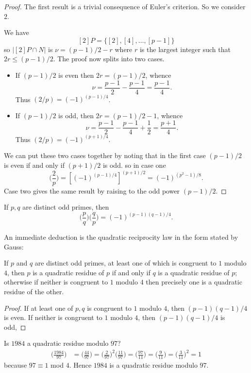 \begin{proof}
The first result is a trivial consequence of Euler's criterion. So we consider $2$.\par
We have 
\[[2]P=\{[2],[4],\dots,[p-1]\}\]
so $|[2]P\cap N|$ is $\nu=(p-1)/2-r$ where $r$ is the largest integer such that $2r\leq(p-1)/2$. The proof now splits into two cases.
\begin{itemize}
\item If $(p-1)/2$ is even then $2r=(p-1)/2$, whence 
\[\nu=\frac{p-1}{2}-\frac{p-1}{4}=\frac{p-1}{4}.\]
Thus $(2/p)=(-1)^{(p-1)/4}$.
\item If $(p-1)/2$ is odd, then $2r=(p-1)/2-1$, whence
\[\nu=\frac{p-1}{2}-\frac{p-1}{4}+\frac{1}{2}=\frac{p+1}{4}.\]
Thus $(2/p)=(-1)^{(p+1)/4}$.
\end{itemize}
We can put these two cases together by noting that in the first case $(p-1)/2$ is even if and only if $(p+1)/2$ is odd. so in case one
\[\Big(\frac{2}{p}\Big)=[(-1)^{(p-1)/4}]^{(p+1)/2}=(-1)^{(p^2-1)/8}.\]
Case two gives the same result by raising to the odd power $(p-1)/2$.
\end{proof}
\begin{theorem}
If $p,q$ are distinct odd primes, then
\[\Big(\frac{p}{q}\Big)\Big(\frac{q}{p}\Big)=(-1)^{(p-1)(q-1)/4}.\]
\end{theorem}
An immediate deduction is the quadratic reciprocity law in the form stated by Gauss:
\begin{proposition}
If $p$ and $q$ are distinct odd primes, at least one of which is congruent to $1$ modulo $4$, then $p$ is a quadratic residue of $p$ if and only if $q$ is a quadratic residue of $p$; otherwise if neither is congruent to $1$ modulo $4$ then precisely one is a quadratic residue of the other.
\end{proposition}
\begin{proof}
If at least one of $p, q$ is congruent to $1$ modulo $4$, then $(p-1)(q-1)/4$
is even. If neither is congruent to $1$ modulo $4$, then $(p-1)(q-1)/4$ is odd,
\end{proof}
\begin{example}
Is $1984$ a quadratic residue modulo $97$?
\begin{align*}
\Big(\frac{1984}{97}\Big)&=\Big(\frac{44}{97}\Big)=\Big(\frac{2}{97}\Big)^2\Big(\frac{11}{97}\Big)=\Big(\frac{97}{11}\Big)=\Big(\frac{9}{11}\Big)=\Big(\frac{3}{11}\Big)^2=1
\end{align*}
because $97\equiv1$ mod $4$. Hence $1984$ is a quadratic residue modulo $97$.
\end{example}